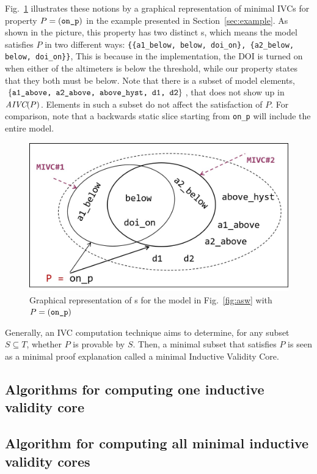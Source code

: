 Fig.~\ref{fig:ivcs} illustrates these notions by a graphical representation of minimal IVCs for property $P = ({\small{\texttt{on\_p}}})$ in the example presented in Section~\ref{sec:example}. As shown in the picture, this property has two distinct \mivc s, which means the model satisfies $P$ in two different ways:  {\small \texttt{\{\{a1\_below, below, doi\_on\}, \{a2\_below, below, doi\_on\}\}}}, This is because in the implementation, the DOI is turned on when either of the altimeters is below the threshold, while our property states that they both must be below.
Note that there is a subset of model elements, $\{{\small \texttt{a1\_above, a2\_above, above\_hyst, d1, d2}}\}$, that does not show up in $\textit{AIVC}(P)$. Elements in such a subset
do not affect the satisfaction of $P$.  For comparison, note that a backwards static slice starting from {\small{\texttt{on\_p}}} will include the entire model.

\begin{figure}[t]
 \centering
  \includegraphics[width=0.9\columnwidth]{figs/ivcs.jpg}
  \vspace{-0.1in}
  \caption{Graphical representation of \mivc s for the model in Fig.~\ref{fig:asw}
  with  $P = ({\small \texttt{on\_p}})$}
  \label{fig:ivcs}
\end{figure}


Generally, an IVC computation technique aims to determine, for any subset $S \subseteq T$, whether $P$ is provable by $S$. Then, a minimal subset that satisfies $P$ is seen as a minimal proof explanation called a minimal Inductive Validity Core.


\subsection{Algorithms for computing one inductive validity core}




\subsection{Algorithm for computing all minimal inductive validity cores}
\label{sec:allivcs}

